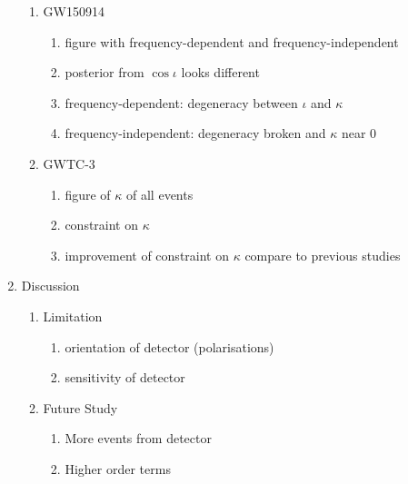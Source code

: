 \documentclass[twocolumn]{aastex631}
\begin{document}
\begin{enumerate}
    \begin{enumerate}
        \item GW150914
        \begin{enumerate}
            \item figure with frequency-dependent and frequency-independent
            \item posterior from $\cos\iota$ looks different
            \item frequency-dependent: degeneracy between $\iota$ and $\kappa$
            \item frequency-independent: degeneracy broken and $\kappa$ near $0$
        \end{enumerate}
        \item GWTC-3
        \begin{enumerate}
            \item figure of $\kappa$ of all events
            \item constraint on $\kappa$
            \item improvement of constraint on $\kappa$ compare to previous studies
        \end{enumerate}
    \end{enumerate}
    \item Discussion
    \begin{enumerate}
        \item Limitation
        \begin{enumerate}
            \item orientation of detector (polarisations)
            \item sensitivity of detector
        \end{enumerate}
        \item Future Study
        \begin{enumerate}
            \item More events from detector
            \item Higher order terms
        \end{enumerate}
    \end{enumerate}
\end{enumerate}
\end{document}
